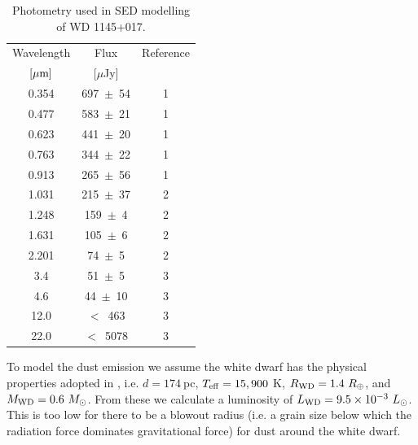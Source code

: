 \documentclass[apj]{emulateapj}
\begin{document}
\begin{table}[]
    \centering
    \caption{Photometry used in SED modelling of WD 1145+017. \label{tab:wd1145p017_phot}}
    \begin{tabular}{ccc}
        \hline\hline
        Wavelength & Flux  & Reference \\
        $[\mu \rm m]$ & [$\mu$Jy] & \\ 
        \hline
        \phantom{0}0.354 & 697~$\pm$~54 & 1\\
        \phantom{0}0.477 & 583~$\pm$~21 & 1\\
        \phantom{0}0.623 & 441~$\pm$~20 & 1\\
        \phantom{0}0.763 & 344~$\pm$~22 & 1\\
        \phantom{0}0.913 & 265~$\pm$~56 & 1\\
        \phantom{0}1.031 & 215~$\pm$~37 & 2\\
        \phantom{0}1.248 & 159~$\pm$~\phantom{0}4 & 2\\
        \phantom{0}1.631 & 105~$\pm$~\phantom{0}6 & 2\\
        \phantom{0}2.201 & \phantom{0}74~$\pm$~\phantom{0}5 & 2\\
        \phantom{0}3.4\phantom{00} & \phantom{0}51~$\pm$~\phantom{0}5 & 3\\
        \phantom{0}4.6\phantom{00} & \phantom{0}44~$\pm$~10 & 3\\
        12.0\phantom{00} & $<$~\phantom{0}463 & 3\\
        22.0\phantom{00} & $<$~5078 & 3\\
        \hline
    \end{tabular}
\end{table}

To model the dust emission we assume the white dwarf has the physical properties adopted in \cite{2015Natur.526..546V}, i.e. $d = 174~$pc, $T_{\rm eff} = 15,900~$K, $R_{\rm WD} = 1.4~R_{\oplus}$, and $M_{\rm WD} = 0.6~M_{\odot}$. From these we calculate a luminosity of $L_{\rm WD} = 9.5\times10^{-3}~L_{\odot}$. This is too low for there to be a blowout radius (i.e. a grain size below which the radiation force dominates gravitational force) for dust around the white dwarf. 
\end{document}
